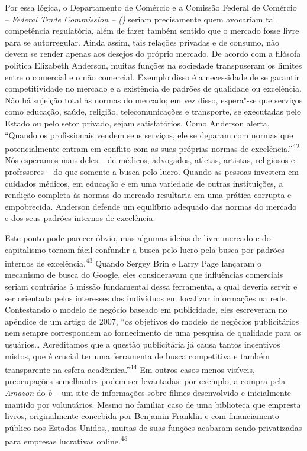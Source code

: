 Por essa lógica, o Departamento de Comércio e a Comissão Federal de
Comércio -- \emph{Federal Trade Commission -- ()} seriam precisamente
quem avocariam tal competência regulatória, além de fazer também sentido
que o mercado fosse livre para se autorregular. Ainda assim, tais
relações privadas e de consumo, não devem se render apenas aos desejos
do próprio mercado. De acordo com a filósofa política Elizabeth
Anderson, muitas funções na sociedade transpuseram os limites entre o
comercial e o não comercial. Exemplo disso é a necessidade de se
garantir competitividade no mercado e a existência de padrões de
qualidade ou excelência. Não há sujeição total às normas do mercado; em
vez disso, espera"-se que serviços como educação, saúde, religião,
telecomunicações e transporte, se executadas pelo Estado ou pelo setor
privado, sejam satisfatórios. Como Anderson alerta, ``Quando os
profissionais vendem seus serviços, ele se deparam com normas que
potencialmente entram em conflito com as suas próprias normas de
excelência.''\textsuperscript{{42}} Nós esperamos mais deles -- de
médicos, advogados, atletas, artistas, religiosos e professores -- do
que somente a busca pelo lucro. Quando as pessoas investem em cuidados
médicos, em educação e em uma variedade de outras instituições, a
rendição completa às normas do mercado resultaria em uma prática
corrupta e empobrecida. Anderson defende um equilíbrio adequado das
normas do mercado e dos seus padrões internos de excelência.

Este ponto pode parecer óbvio, mas algumas ideias de livre mercado e do
capitalismo tornam fácil confundir a busca pelo lucro pela busca por
padrões internos de excelência.\textsuperscript{{43}} Quando Sergey Brin
e Larry Page lançaram o mecanismo de busca do Google, eles consideravam
que influências comerciais seriam contrárias à missão fundamental dessa
ferramenta, a qual deveria servir e ser orientada pelos interesses dos
indivíduos em localizar informações na rede. Contestando o modelo de
negócio baseado em publicidade, eles escreveram no apêndice de um artigo
de 2007, ``os objetivos do modelo de negócios publicitários nem sempre
correspondem ao fornecimento de uma pesquisa de qualidade para os
usuários\ldots{} Acreditamos que a questão publicitária já causa tantos
incentivos mistos, que é crucial ter uma ferramenta de busca competitiva
e também transparente na esfera acadêmica.''\textsuperscript{{44}} Em
outros casos menos visíveis, preocupações semelhantes podem ser
levantadas: por exemplo, a compra pela \emph{Amazon} do \emph{b} -- um
site de informações sobre filmes desenvolvido e inicialmente mantido por
voluntários. Mesmo no familiar caso de uma biblioteca que empresta
livros, originalmente concebida por Benjamin Franklin e com
financiamento público nos Estados Unidos,, muitas de suas funções
acabaram sendo privatizadas para empresas lucrativas
online.\textsuperscript{{45}}

